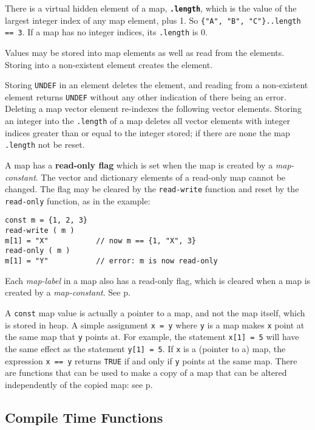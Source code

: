 \documentclass[12pt]{article}
\newcommand{\key}[1]{{\rm \bfseries #1}}
\newcommand{\ttdkey}[1]{{\tt \bfseries .#1}}
\newcommand{\pagref}[1]{p\pageref{#1}}
\newenvironment{indpar}[1][0.3in]%
	{\begin{list}{}%
		     {\setlength{\itemsep}{0in}%
		      \setlength{\topsep}{0in}%
		      \setlength{\parsep}{1ex}%
		      \setlength{\labelwidth}{#1}%
		      \setlength{\leftmargin}{#1}%
		      \addtolength{\leftmargin}{\labelsep}}%
	 \item}%
	{\end{list}}
\begin{document}
There is a virtual hidden element of a map, \ttdkey{length}, which is
the value of the largest integer index of any map element,
plus 1.  So {\tt \{"A", "B", "C"\}..length == 3}.  If a map has no
integer indices, its {\tt .length} is 0.

Values may be stored into map elements as well as read from the
elements.  Storing into a non-existent element creates the element.

Storing {\tt UNDEF} in an element deletes the element, and reading
from a non-existent element returns {\tt UNDEF} without any other
indication of there being an error.  Deleting a map vector element
re-indexes the following vector elements.
Storing an integer into the {\tt .length} of a map deletes
all vector elements with integer indices greater than or equal
to the integer stored; if there are none the map {\tt .length} not be reset.

A map has a \key{read-only flag} which is set when the map is created
by a {\em map-constant}.  The vector and dictionary elements of a
read-only map cannot be changed.  The flag may be cleared by the
{\tt read-write} function and reset by the {\tt read-only} function,
as in the example:
\begin{indpar}\begin{verbatim}
const m = {1, 2, 3}
read-write ( m )
m[1] = "X"           // now m == {1, "X", 3}
read-only ( m )
m[1] = "Y"           // error: m is now read-only
\end{verbatim}\end{indpar}

Each {\em map-label} in a map also has a read-only flag, which is
cleared when a map is created by a {\em map-constant}.
See \pagref{READ-ONLY-DICTIONARY-FUNCTION}.

A {\tt const} map value is actually a pointer to a map, and
not the map itself, which is stored in heap.
A simple assignment {\tt x = y} where {\tt y} is a map makes
{\tt x} point at the same map that {\tt y} points at.  For
example, the statement {\tt x[1] = 5} will have the same effect as
the statement {\tt y[1] = 5}.  If {\tt x} is a (pointer to a) map,
the expression {\tt x == y} returns
{\tt TRUE} if and only if {\tt y} points at the same map. 
There are functions that can be used to make a
copy of a map that can be altered independently of the
copied map: see \pagref{MAP-COPY}.

\subsection{Compile Time Functions}
\end{document}
